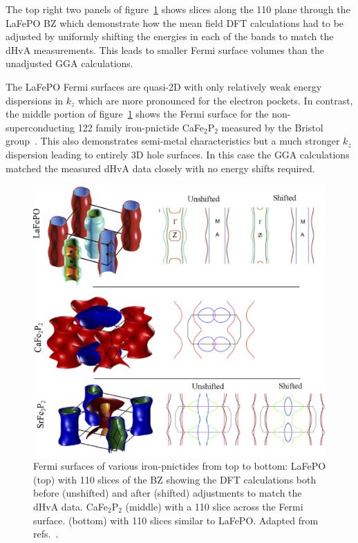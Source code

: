 The top right two panels of figure~\ref{Fig:Intro:PnictideFS} shows slices along the 110 plane through the LaFePO \ac{BZ} which demonstrate how the mean field \ac{DFT} calculations had to be adjusted by uniformly shifting the energies in each of the bands to match the \ac{dHvA} measurements. This leads to smaller Fermi surface volumes than the unadjusted \ac{GGA} calculations.

The LaFePO Fermi surfaces are quasi-2D with only relatively weak energy dispersions in $k_z$ which are more pronounced for the electron pockets. In contrast, the middle portion of figure~\ref{Fig:Intro:PnictideFS} shows the Fermi surface for the non-superconducting 122 family iron-pnictide CaFe$_2$P$_2$ measured by the Bristol group~\cite{Coldea2009}. This also demonstrates semi-metal characteristics but a much stronger $k_z$ dispersion leading to entirely 3D hole surfaces. In this case the \ac{GGA} calculations matched the measured \ac{dHvA} data closely with no energy shifts required.
\begin{figure}[htbp]
    \begin{center}
        \includegraphics[scale=0.7]{Chapter-Introduction/Figures/PnictideFS/PnictideFS}
        \caption{Fermi surfaces of various iron-pnictides from top to bottom: LaFePO (top) with 110 slices of the \ac{BZ} showing the \ac{DFT} calculations both before (unshifted) and after (shifted) adjustments to match the \ac{dHvA} data. CaFe$_2$P$_2$ (middle) with a 110 slice across the Fermi surface. \SrFeP{} (bottom) with 110 slices similar to LaFePO. Adapted from refs.~\cite{Carrington2009, Coldea2009, Carrington2011, Analytis2009}.}
        \label{Fig:Intro:PnictideFS}
    \end{center}
\end{figure}

